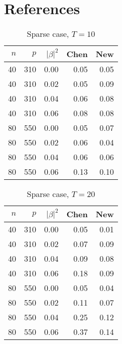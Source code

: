 \documentclass[review]{elsarticle}
\begin{document}
\section*{References}


\begin{table}[ht]
    \centering
    \begin{tabular}{rrrrr}
          \hline
          $n$ & $p$ & $|\beta|^2$ & Chen & New \\ 
            \hline
            40 & 310 & 0.00 & 0.05 & 0.05 \\ 
              40 & 310 & 0.02 & 0.05 & 0.09 \\ 
                40 & 310 & 0.04 & 0.06 & 0.08 \\ 
                  40 & 310 & 0.06 & 0.08 & 0.08 \\ 
                    80 & 550 & 0.00 & 0.05 & 0.07 \\ 
                      80 & 550 & 0.02 & 0.06 & 0.04 \\ 
                        80 & 550 & 0.04 & 0.06 & 0.06 \\ 
                          80 & 550 & 0.06 & 0.13 & 0.10 \\ 
                             \hline
    \end{tabular}
    \caption{Sparse case, $T=10$}
\end{table}


\begin{table}[ht]
    \centering
    \begin{tabular}{rrrrr}
          \hline
          $n$ & $p$ & $|\beta|^2$ & Chen & New \\ 
            \hline
            40 & 310 & 0.00 & 0.05 & 0.01 \\ 
              40 & 310 & 0.02 & 0.07 & 0.09 \\ 
                40 & 310 & 0.04 & 0.09 & 0.08 \\ 
                  40 & 310 & 0.06 & 0.18 & 0.09 \\ 
                    80 & 550 & 0.00 & 0.05 & 0.04 \\ 
                      80 & 550 & 0.02 & 0.11 & 0.07 \\ 
                        80 & 550 & 0.04 & 0.25 & 0.12 \\ 
                          80 & 550 & 0.06 & 0.37 & 0.14 \\ 
                             \hline
    \end{tabular}
    \caption{Sparse case, $T=20$}
\end{table}


\end{document}
